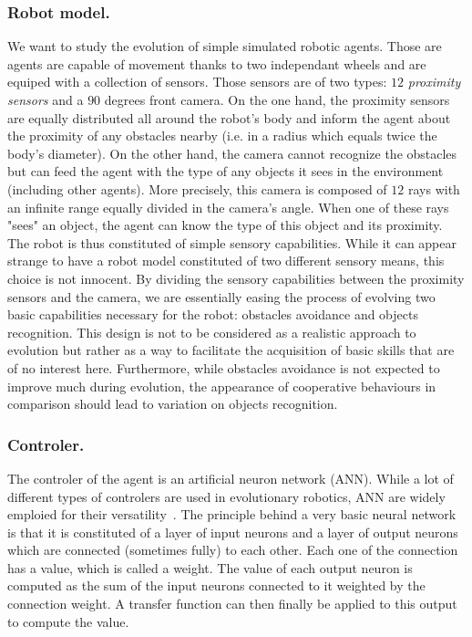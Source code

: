     \subsubsection{Robot model.} We want to study the evolution of simple simulated robotic agents. Those are agents are capable of movement thanks to two independant wheels and are equiped with a collection of sensors. Those sensors are of two types: $12$ \emph{proximity sensors} and a $90$ degrees front {camera}. On the one hand, the proximity sensors are equally distributed all around the robot's body and inform the agent about the proximity of any obstacles nearby (i.e. in a radius which equals twice the body's diameter). On the other hand, the camera cannot recognize the obstacles but can feed the agent with the type of any objects it sees in the environment (including other agents). More precisely, this camera is composed of $12$ rays with an infinite range equally divided in the camera's angle. When one of these rays "sees" an object, the agent can know the type of this object and its proximity. The robot is thus constituted of simple sensory capabilities. While it can appear strange to have a robot model constituted of two different sensory means, this choice is not innocent. By dividing the sensory capabilities between the proximity sensors and the camera, we are essentially easing the process of evolving two basic capabilities necessary for the robot: obstacles avoidance and objects recognition. This design is not to be considered as a realistic approach to evolution but rather as a way to facilitate the acquisition of basic skills that are of no interest here. Furthermore, while obstacles avoidance is not expected to improve much during evolution, the appearance of cooperative behaviours in comparison should lead to variation on objects recognition.

    \subsubsection{Controler.} The controler of the agent is an artificial neuron network (ANN). While a lot of different types of controlers are used in evolutionary robotics, ANN are widely emploied for their versatility~\parencite{Doncieux2015}. The principle behind a very basic neural network is that it is constituted of a layer of input neurons and a layer of output neurons which are connected (sometimes fully) to each other. Each one of the connection has a value, which is called a weight. The value of each output neuron is computed as the sum of the input neurons connected to it weighted by the connection weight. A transfer function can then finally be applied to this output to compute the value. 

